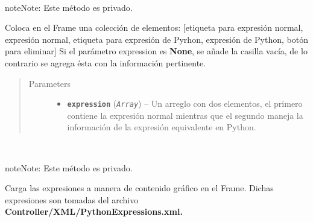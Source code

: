 \documentclass[class=report, crop=false]{standalone}
\begin{document}
\begin{fulllineitems}
\begin{fulllineitems}
\end{fulllineitems}

\begin{fulllineitems}

~

\begin{notice}{note}{Note:}
Este método es privado.
\end{notice}

Coloca en el Frame una colección de elementos:\break
{[}etiqueta para expresión normal, expresión normal, etiqueta para expresión de Pyrhon, expresión de Python, botón para eliminar{]}\break
Si el parámetro expression es \textbf{None}, se añade 
la casilla vacía, de lo contrario se agrega ésta 
con la información pertinente.\break

\begin{quote}\begin{description}
\item[{Parameters}] \leavevmode\begin{itemize}
\item \textbf{\texttt{expression}} (\emph{\texttt{Array}}) -- Un arreglo con dos elementos, el primero contiene la expresión normal mientras que el segundo maneja la información de la expresión equivalente en Python.
\end{itemize}
\end{description}\end{quote}

\end{fulllineitems}

\begin{fulllineitems}

~

\begin{notice}{note}{Note:}
Este método es privado.
\end{notice}

Carga las expresiones a manera de contenido gráfico
en el Frame.\break
Dichas expresiones son tomadas del archivo \textbf{Controller/XML/}\break\textbf{PythonExpressions.xml.}

\end{fulllineitems}

\begin{fulllineitems}


\end{fulllineitems}
\end{fulllineitems}
\end{document}

